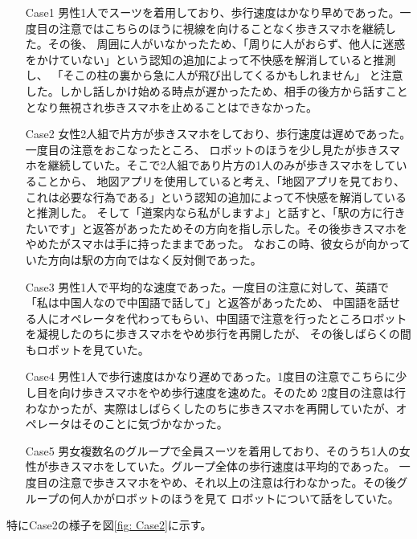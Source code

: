 \documentclass{kuisthesis}
\begin{document}
\begin{enumerate}
  \item[Case1] 男性1人でスーツを着用しており、歩行速度はかなり早めであった。一度目の注意ではこちらのほうに視線を向けることなく歩きスマホを継続した。その後、
  周囲に人がいなかったため、「周りに人がおらず、他人に迷惑をかけていない」という認知の追加によって不快感を解消していると推測し、
  「そこの柱の裏から急に人が飛び出してくるかもしれません」
  と注意した。しかし話しかけ始める時点が遅かったため、相手の後方から話すこととなり無視され歩きスマホを止めることはできなかった。
  \item[Case2] 女性2人組で片方が歩きスマホをしており、歩行速度は遅めであった。一度目の注意をおこなったところ、
  ロボットのほうを少し見たが歩きスマホを継続していた。そこで2人組であり片方の1人のみが歩きスマホをしていることから、
  地図アプリを使用していると考え、「地図アプリを見ており、これは必要な行為である」という認知の追加によって不快感を解消していると推測した。
  そして「道案内なら私がしますよ」と話すと、「駅の方に行きたいです」と返答があったためその方向を指し示した。その後歩きスマホをやめたがスマホは手に持ったままであった。
  なおこの時、彼女らが向かっていた方向は駅の方向ではなく反対側であった。
  \item[Case3] 男性1人で平均的な速度であった。一度目の注意に対して、英語で「私は中国人なので中国語で話して」と返答があったため、
  中国語を話せる人にオペレータを代わってもらい、中国語で注意を行ったところロボットを凝視したのちに歩きスマホをやめ歩行を再開したが、
  その後しばらくの間もロボットを見ていた。
  \item[Case4] 男性1人で歩行速度はかなり遅めであった。1度目の注意でこちらに少し目を向け歩きスマホをやめ歩行速度を速めた。そのため
  2度目の注意は行わなかったが、実際はしばらくしたのちに歩きスマホを再開していたが、オペレータはそのことに気づかなかった。
  \item[Case5] 男女複数名のグループで全員スーツを着用しており、そのうち1人の女性が歩きスマホをしていた。グループ全体の歩行速度は平均的であった。
  一度目の注意で歩きスマホをやめ、それ以上の注意は行わなかった。その後グループの何人かがロボットのほうを見て
  ロボットについて話をしていた。
\end{enumerate}
特にCase2の様子を図\ref{fig: Case2}に示す。
\end{document}
